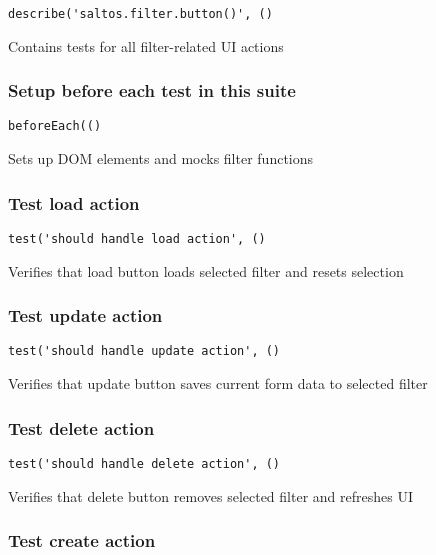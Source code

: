 \documentclass[a4paper]{article}
\begin{document}
\begin{lstlisting}
describe('saltos.filter.button()', ()
\end{lstlisting}

Contains tests for all filter-related UI actions

\hypertarget{toc166}{}
\subsubsection{Setup before each test in this suite}

\begin{lstlisting}
beforeEach(()
\end{lstlisting}

Sets up DOM elements and mocks filter functions

\hypertarget{toc167}{}
\subsubsection{Test load action}

\begin{lstlisting}
test('should handle load action', ()
\end{lstlisting}

Verifies that load button loads selected filter and resets selection

\hypertarget{toc168}{}
\subsubsection{Test update action}

\begin{lstlisting}
test('should handle update action', ()
\end{lstlisting}

Verifies that update button saves current form data to selected filter

\hypertarget{toc169}{}
\subsubsection{Test delete action}

\begin{lstlisting}
test('should handle delete action', ()
\end{lstlisting}

Verifies that delete button removes selected filter and refreshes UI

\hypertarget{toc170}{}
\subsubsection{Test create action}
\end{document}
